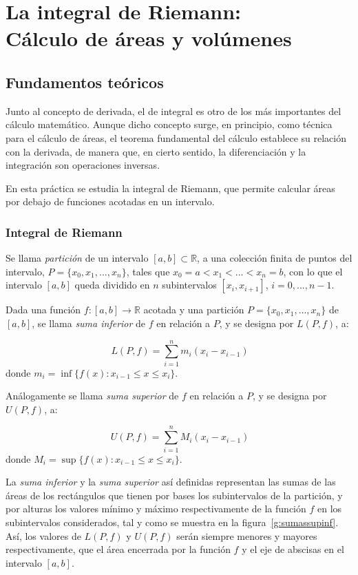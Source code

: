 
\chapter[La integral de Riemman: Cálculo de áreas y volúmenes]{La integral de Riemann:\\ Cálculo de áreas y volúmenes}

\section{Fundamentos teóricos}
Junto al concepto de derivada, el de integral es otro de los más
importantes del cálculo matemático. Aunque dicho concepto surge, en
principio, como técnica para el cálculo de áreas, el teorema
fundamental del cálculo establece su relación con la derivada, de
manera que, en cierto sentido, la diferenciación y la integración
son operaciones inversas.

En esta práctica se estudia la integral de Riemann, que permite
calcular áreas por debajo de funciones acotadas en un intervalo.

\subsection*{Integral de Riemann}

Se llama \emph{partición} de un intervalo $[a,b]\subset\mathbb{R}$,
a una colección finita de puntos del intervalo,
$P=\{x_{0},x_{1},...,x_{n}\}$,  tales que
$x_{0}=a<x_{1}<...<x_{n}=b$, con lo que el intervalo $[a,b]$ queda
dividido en $n$ subintervalos $[x_{i},x_{i+1}]$, $i=0,...,n-1$.

Dada una función $f:[a,b]\rightarrow\mathbb{R}$ acotada y una
partición $P=\{x_{0},x_{1},...,x_{n}\}$ de $[a,b]$, se llama
\emph{suma inferior} de $f$ en relación a $P$, y se designa por
$L(P,f)$, a:

\[
\ L(P,f)=\sum_{i=1}^{n} m_{i}(x_{i}-x_{i-1})
\]
donde $  m_{i}=\inf\{f(x):x_{i-1}\leq x \leq x_{i}\}$.

Análogamente se llama \emph{suma superior} de $f$ en relación a $P$,
y se designa por $U(P,f)$, a:

\[
\ U(P,f)=\sum_{i=1}^{n} M_{i}(x_{i}-x_{i-1})
\]
donde $ M_{i}=\sup\{f(x):x_{i-1}\leq x \leq x_{i}\}$.

La \emph{suma inferior} y la \emph{suma superior} así definidas representan las sumas de las áreas de los rectángulos que tienen por bases los subintervalos de la partición, y por alturas los valores mínimo y máximo respectivamente de la función $f$ en los subintervalos considerados, tal y como se muestra en la figura~\ref{g:sumassupinf}. Así, los valores de $L(P,f)$ y $U(P,f)$ serán siempre menores y mayores respectivamente, que el área encerrada por la función $f$ y el eje de abscisas en el intervalo $[a,b]$.

